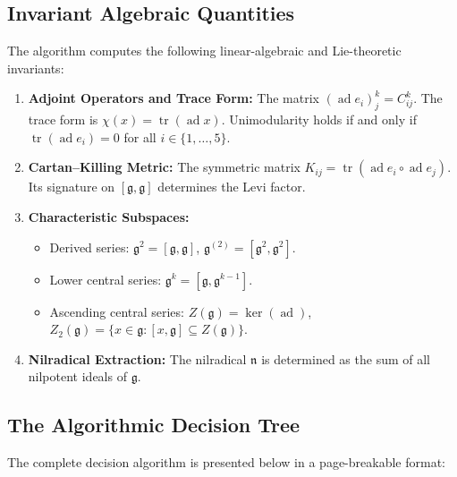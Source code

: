 \documentclass[11pt,a4paper]{article}
\theoremstyle{definition}
\theoremstyle{remark}
\newcommand{\g}{\mathfrak{g}}
\newcommand{\n}{\mathfrak{n}}
\newcommand{\ad}{\operatorname{ad}}
\newcommand{\tr}{\operatorname{tr}}
\begin{document}
\subsection{Invariant Algebraic Quantities}
The algorithm computes the following linear-algebraic and Lie-theoretic invariants:
\begin{enumerate}
    \item \textbf{Adjoint Operators and Trace Form:} The matrix $(\ad e_i)^k_j = C_{ij}^k$. The trace form is $\chi(x) = \tr(\ad x)$. Unimodularity holds if and only if $\tr(\ad e_i) = 0$ for all $i \in \{1, \dots, 5\}$.
    \item \textbf{Cartan--Killing Metric:} The symmetric matrix $K_{ij} = \tr(\ad e_i \circ \ad e_j)$. Its signature on $[\g, \g]$ determines the Levi factor.
    \item \textbf{Characteristic Subspaces:}
    \begin{itemize}
        \item Derived series: $\g^2 = [\g, \g]$, $\g^{(2)} = [\g^2, \g^2]$.
        \item Lower central series: $\g^k = [\g, \g^{k-1}]$.
        \item Ascending central series: $Z(\g) = \ker(\ad)$, $Z_2(\g) = \{ x \in \g : [x, \g] \subseteq Z(\g) \}$.
    \end{itemize}
    \item \textbf{Nilradical Extraction:} The nilradical $\n$ is determined as the sum of all nilpotent ideals of $\g$.
\end{enumerate}

\subsection{The Algorithmic Decision Tree}
The complete decision algorithm is presented below in a page-breakable format:
\end{document}
